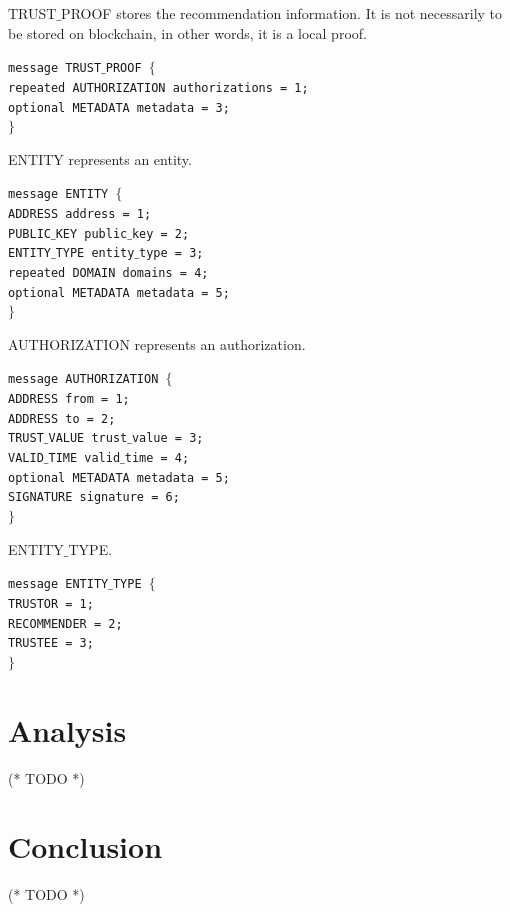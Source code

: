 \documentclass{article}
\begin{document}
TRUST$\_$PROOF stores the recommendation information. It is not necessarily to be stored on blockchain, in other words, it is a local proof.


\noindent \texttt{message TRUST$\_$PROOF $\{$\\
\hspace*{2.ex} repeated AUTHORIZATION authorizations = 1;\\
\hspace*{2.ex} optional METADATA metadata = 3;\\
$\}$}

ENTITY represents an entity.


\noindent \texttt{message ENTITY $\{$\\
\hspace*{2.ex} ADDRESS address = 1;\\
\hspace*{2.ex} PUBLIC$\_$KEY public$\_$key = 2;\\
\hspace*{2.ex} ENTITY$\_$TYPE entity$\_$type = 3;\\
\hspace*{2.ex} repeated DOMAIN domains = 4;\\
\hspace*{2.ex} optional METADATA metadata = 5;\\
$\}$}

AUTHORIZATION represents an authorization.


\noindent \texttt{message AUTHORIZATION $\{$\\
\hspace*{2.ex} ADDRESS from = 1;\\
\hspace*{2.ex} ADDRESS to = 2;\\
\hspace*{2.ex} TRUST$\_$VALUE trust$\_$value = 3;\\
\hspace*{2.ex} VALID$\_$TIME valid$\_$time = 4;\\
\hspace*{2.ex} optional METADATA metadata = 5;\\
\hspace*{2.ex} SIGNATURE signature = 6;\\
$\}$}

ENTITY$\_$TYPE.


\noindent \texttt{message ENTITY$\_$TYPE $\{$\\
\hspace*{2.ex} TRUSTOR = 1;\\
\hspace*{2.ex} RECOMMENDER = 2;\\
\hspace*{2.ex} TRUSTEE = 3;\\
$\}$}


\section{Analysis}

(* TODO *)


\section{Conclusion}

(* TODO *)
\end{document}

